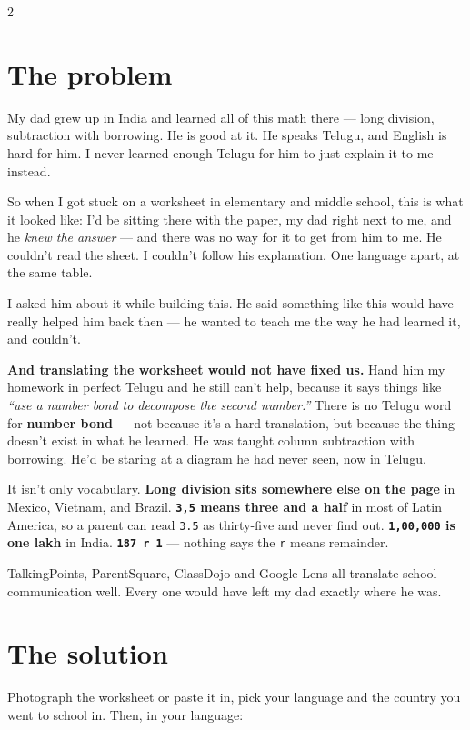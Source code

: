 \documentclass[9pt,letterpaper]{extarticle}
\begin{document}
\begin{multicols}{2}

\section*{The problem}

My dad grew up in India and learned all of this math there --- long division, subtraction with borrowing. He is good at it. He speaks Telugu, and English is hard for him. I never learned enough Telugu for him to just explain it to me instead.

So when I got stuck on a worksheet in elementary and middle school, this is what it looked like: I'd be sitting there with the paper, my dad right next to me, and he \emph{knew the answer} --- and there was no way for it to get from him to me. He couldn't read the sheet. I couldn't follow his explanation. One language apart, at the same table.

I asked him about it while building this. He said something like this would have really helped him back then --- he wanted to teach me the way he had learned it, and couldn't.

\textbf{And translating the worksheet would not have fixed us.} Hand him my homework in perfect Telugu and he still can't help, because it says things like \emph{``use a number bond to decompose the second number.''} There is no Telugu word for \textbf{number bond} --- not because it's a hard translation, but because the thing doesn't exist in what he learned. He was taught column subtraction with borrowing. He'd be staring at a diagram he had never seen, now in Telugu.

It isn't only vocabulary. \textbf{Long division sits somewhere else on the page} in Mexico, Vietnam, and Brazil. \textbf{\texttt{3,5} means three and a half} in most of Latin America, so a parent can read \texttt{3.5} as thirty-five and never find out. \textbf{\texttt{1,00,000} is one lakh} in India. \textbf{\texttt{187 r 1}} --- nothing says the \texttt{r} means remainder.

TalkingPoints, ParentSquare, ClassDojo and Google Lens all translate school communication well. Every one would have left my dad exactly where he was.

\section*{The solution}

Photograph the worksheet or paste it in, pick your language and the country you went to school in. Then, in your language:


\end{multicols}
\end{document}
